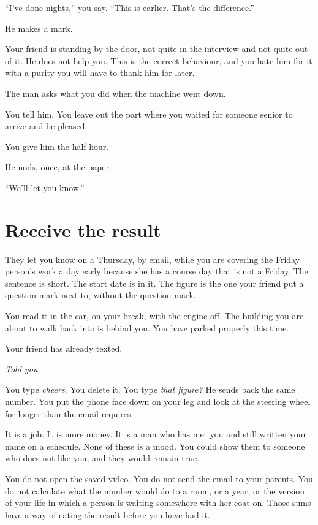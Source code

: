 \documentclass[11pt,oneside]{book}
\begin{document}
``I've done nights,'' you say. ``This is earlier. That's the difference.''

He makes a mark.

Your friend is standing by the door, not quite in the interview and not quite out of it. He does not help you. This is the correct behaviour, and you hate him for it with a purity you will have to thank him for later.

The man asks what you did when the machine went down.

You tell him. You leave out the part where you waited for someone senior to arrive and be pleased.

You give him the half hour.

He nods, once, at the paper.

``We'll let you know.''

\section*{Receive the result}

They let you know on a Thursday, by email, while you are covering the Friday person's work a day early because she has a course day that is not a Friday. The sentence is short. The start date is in it. The figure is the one your friend put a question mark next to, without the question mark.

You read it in the car, on your break, with the engine off. The building you are about to walk back into is behind you. You have parked properly this time.

Your friend has already texted.

\emph{Told you.}

You type \emph{cheers}. You delete it. You type \emph{that figure?} He sends back the same number. You put the phone face down on your leg and look at the steering wheel for longer than the email requires.

It is a job. It is more money. It is a man who has met you and still written your name on a schedule. None of these is a mood. You could show them to someone who does not like you, and they would remain true.

You do not open the saved video. You do not send the email to your parents. You do not calculate what the number would do to a room, or a year, or the version of your life in which a person is waiting somewhere with her coat on. Those sums have a way of eating the result before you have had it.
\end{document}
